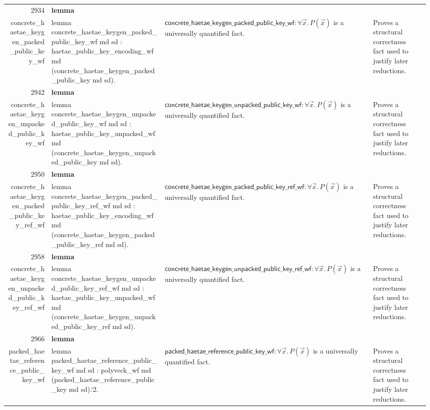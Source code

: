 \documentclass[10pt]{article}
\newcommand{\ec}[1]{\begingroup\ttfamily\scriptsize #1\endgroup}
\begin{document}
\begin{longtable}{r L{0.17\textwidth} L{0.26\textwidth} L{0.27\textwidth} L{0.20\textwidth}}
2934 & \textbf{lemma}\\\ec{concrete\_haetae\_keygen\_packed\_public\_key\_wf} & \ec{lemma concrete\_haetae\_keygen\_packed\_public\_key\_wf md sd : haetae\_public\_key\_encoding\_wf md (concrete\_haetae\_keygen\_packed\_public\_key md sd).} & \(\mathsf{concrete\_haetae\_keygen\_packed\_public\_key\_wf} : \forall \vec{x}.\, P(\vec{x})\) is a universally quantified fact. & Proves a structural correctness fact used to justify later reductions. \\
2942 & \textbf{lemma}\\\ec{concrete\_haetae\_keygen\_unpacked\_public\_key\_wf} & \ec{lemma concrete\_haetae\_keygen\_unpacked\_public\_key\_wf md sd : haetae\_public\_key\_unpacked\_wf md (concrete\_haetae\_keygen\_unpacked\_public\_key md sd).} & \(\mathsf{concrete\_haetae\_keygen\_unpacked\_public\_key\_wf} : \forall \vec{x}.\, P(\vec{x})\) is a universally quantified fact. & Proves a structural correctness fact used to justify later reductions. \\
2950 & \textbf{lemma}\\\ec{concrete\_haetae\_keygen\_packed\_public\_key\_ref\_wf} & \ec{lemma concrete\_haetae\_keygen\_packed\_public\_key\_ref\_wf md sd : haetae\_public\_key\_encoding\_wf md (concrete\_haetae\_keygen\_packed\_public\_key\_ref md sd).} & \(\mathsf{concrete\_haetae\_keygen\_packed\_public\_key\_ref\_wf} : \forall \vec{x}.\, P(\vec{x})\) is a universally quantified fact. & Proves a structural correctness fact used to justify later reductions. \\
2958 & \textbf{lemma}\\\ec{concrete\_haetae\_keygen\_unpacked\_public\_key\_ref\_wf} & \ec{lemma concrete\_haetae\_keygen\_unpacked\_public\_key\_ref\_wf md sd : haetae\_public\_key\_unpacked\_wf md (concrete\_haetae\_keygen\_unpacked\_public\_key\_ref md sd).} & \(\mathsf{concrete\_haetae\_keygen\_unpacked\_public\_key\_ref\_wf} : \forall \vec{x}.\, P(\vec{x})\) is a universally quantified fact. & Proves a structural correctness fact used to justify later reductions. \\
2966 & \textbf{lemma}\\\ec{packed\_haetae\_reference\_public\_key\_wf} & \ec{lemma packed\_haetae\_reference\_public\_key\_wf md sd : polyveck\_wf md (packed\_haetae\_reference\_public\_key md sd).`2.} & \(\mathsf{packed\_haetae\_reference\_public\_key\_wf} : \forall \vec{x}.\, P(\vec{x})\) is a universally quantified fact. & Proves a structural correctness fact used to justify later reductions. \\

\end{longtable}
\end{document}
